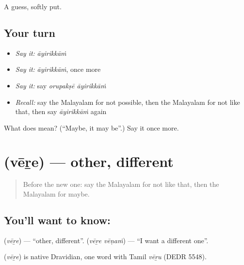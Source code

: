 \begin{grammarlens}[title={What you've built}]
A guess, softly put.
\end{grammarlens}

\subsection*{Your turn}
\begin{itemize}
\raggedright
  \item \emph{Say it:} \emph{āyirikkāṁ}
  \item \emph{Say it:} \emph{āyirikkāṁ}, once more
  \item \emph{Say it:} say \emph{orupakṣē āyirikkāṁ}
  \item \emph{Recall:} say the Malayalam for not possible, then the Malayalam for not like that, then say \emph{āyirikkāṁ} again
\end{itemize}

\begin{tcolorbox}[breakable,colback=teal!4,colframe=teal!35!black,title={Before you move on}]
What does  mean? (\textquotedblleft{}Maybe, it may be\textquotedblright{}.) Say it once more.
\end{tcolorbox}
\section[\texorpdfstring{\ml{വേറെ} (vēṟe)}{വേറെ (vēṟe)}]{ (vēṟe) — other, different}

\label{lesson:ML-C123-other}



\begin{quote}
Before the new one: say the Malayalam for not like that, then the Malayalam for maybe.
\end{quote}

\subsection*{You'll want to know: }
\textbf{} (\emph{vēṟe}) — \textquotedblleft{}other, different\textquotedblright{}. \textbf{ } (\emph{vēṟe vēṇaṁ}) — \textquotedblleft{}I want a different one\textquotedblright{}.

\begin{cousinweb}
\textbf{} (\emph{vēṟe}) is native Dravidian, one word with Tamil \emph{vēṟu} (DEDR 5548).
\end{cousinweb}

